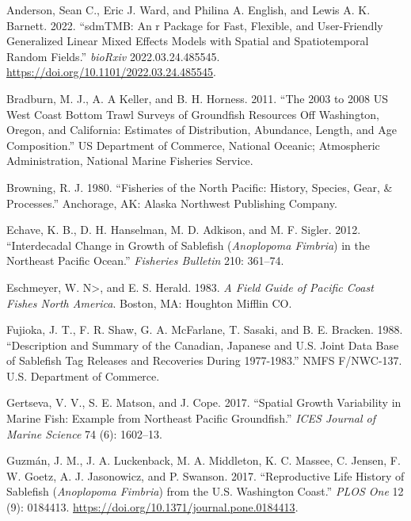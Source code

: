 \documentclass[
]{scrartcl}
\newlength{\cslhangindent}
\newenvironment{CSLReferences}[2] %
 {\begin{list}{}{%
  \setlength{\itemindent}{0pt}
  \setlength{\leftmargin}{0pt}
  \setlength{\parsep}{0pt}
  \ifodd #1
   \setlength{\leftmargin}{\cslhangindent}
   \setlength{\itemindent}{-1\cslhangindent}
  \fi
  \setlength{\itemsep}{#2\baselineskip}}}
 {\end{list}}
\begin{document}
\label{refs}
\begin{CSLReferences}{1}{0}
Anderson, Sean C., Eric J. Ward, and Philina A. English, and Lewis A. K.
Barnett. 2022. {``{sdmTMB}: An r Package for Fast, Flexible, and
User-Friendly Generalized Linear Mixed Effects Models with Spatial and
Spatiotemporal Random Fields.''} \emph{bioRxiv} 2022.03.24.485545.
\url{https://doi.org/10.1101/2022.03.24.485545}.

Bradburn, M. J., A. A Keller, and B. H. Horness. 2011. {``The 2003 to
2008 {US} {West} {Coast} Bottom Trawl Surveys of Groundfish Resources
Off {Washington}, {Oregon}, and {California}: Estimates of Distribution,
Abundance, Length, and Age Composition.''} US Department of Commerce,
National Oceanic; Atmospheric Administration, National Marine Fisheries
Service.

Browning, R. J. 1980. {``Fisheries of the {N}orth {P}acific: History,
Species, Gear, \& Processes.''} Anchorage, AK: Alaska Northwest
Publishing Company.

Echave, K. B., D. H. Hanselman, M. D. Adkison, and M. F. Sigler. 2012.
{``Interdecadal Change in Growth of Sablefish (\emph{{A}noplopoma
Fimbria}) in the Northeast {P}acific {O}cean.''} \emph{Fisheries
Bulletin} 210: 361--74.

Eschmeyer, W. N\textgreater, and E. S. Herald. 1983. \emph{A Field Guide
of {Pacific} Coast Fishes {North} {America}}. Boston, MA: Houghton
Mifflin CO.

Fujioka, J. T., F. R. Shaw, G. A. McFarlane, T. Sasaki, and B. E.
Bracken. 1988. {``Description and Summary of the {C}anadian, {J}apanese
and {U}.{S}. Joint Data Base of Sablefish Tag Releases and Recoveries
During 1977-1983.''} NMFS F/NWC-137. {U}.{S}. Department of Commerce.

Gertseva, V. V., S. E. Matson, and J. Cope. 2017. {``Spatial Growth
Variability in Marine Fish: Example from {N}ortheast {P}acific
Groundfish.''} \emph{{ICES} Journal of Marine Science} 74 (6): 1602--13.

Guzmán, J. M., J. A. Luckenback, M. A. Middleton, K. C. Massee, C.
Jensen, F. W. Goetz, A. J. Jasonowicz, and P. Swanson. 2017.
{``Reproductive Life History of Sablefish (\emph{{A}noplopoma Fimbria})
from the {U}.{S}. {W}ashington Coast.''} \emph{{PLOS} One} 12 (9):
0184413. \url{https://doi.org/10.1371/journal.pone.0184413}.


\end{CSLReferences}
\end{document}
